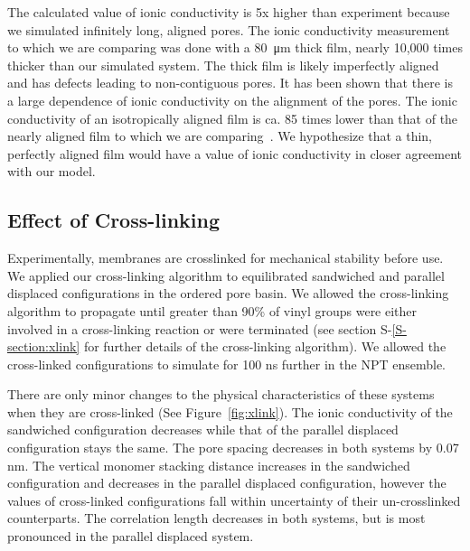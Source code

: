 \documentclass[journal=jpcbfk,manuscript=article]{achemso}
\begin{document}
  The calculated value of ionic conductivity is 5x higher than experiment because 
  we simulated infinitely long, aligned pores. The ionic conductivity measurement 
  to which we are comparing was done with a \SI{80}{\micro\metre} thick film, 
  nearly 10,000 times thicker than our simulated
  system. The thick film is likely imperfectly aligned and has defects leading to
  non-contiguous pores. It has been shown that there is a large dependence of 
  ionic conductivity on the alignment of the pores. The ionic conductivity of an
  isotropically aligned film is ca. 85 times lower than that of the nearly aligned
  film to which we are comparing~\cite{feng_scalable_2014}. We hypothesize that a 
  thin, perfectly aligned film would have a value of ionic conductivity in closer
  agreement with our model.

  \subsection{Effect of Cross-linking}\label{section:xlink}

  Experimentally, membranes are crosslinked for mechanical stability before use. We applied 
  our cross-linking algorithm to equilibrated sandwiched and parallel
  displaced configurations in the ordered pore basin. We allowed the cross-linking
  algorithm to propagate until greater than 90\% of vinyl groups were either involved
  in a cross-linking reaction or were terminated (see section S-\ref{S-section:xlink}
  for further details of the cross-linking algorithm). We allowed the cross-linked
  configurations to simulate for 100 ns further in the NPT ensemble. 

  There are only minor changes to the physical characteristics of these systems when 
  they are cross-linked (See Figure~\ref{fig:xlink}). The ionic conductivity of 
  the sandwiched configuration decreases while that of the parallel displaced 
  configuration stays the same. The pore spacing decreases in both systems by
  0.07 nm. The vertical monomer stacking distance increases in the sandwiched
  configuration and decreases in the parallel displaced configuration, however the 
  values of cross-linked configurations fall within uncertainty of their un-crosslinked
  counterparts. The correlation length decreases in both systems, 
  but is most pronounced in the parallel displaced system.  
  
\end{document}
